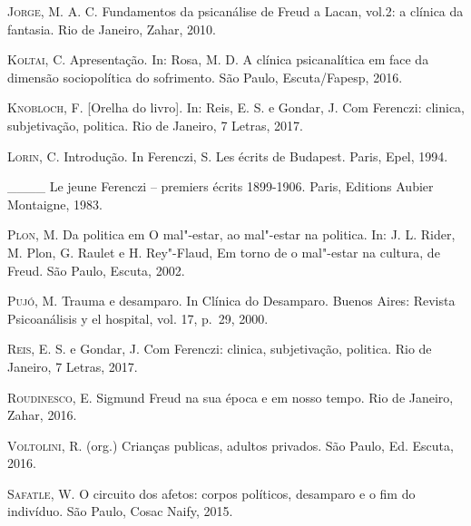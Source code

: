 \textsc{Jorge}, M. A. C. Fundamentos da psicanálise de Freud a Lacan, vol.2: a
clínica da fantasia. Rio de Janeiro, Zahar, 2010.

\textsc{Koltai}, C. Apresentação. In: Rosa, M. D. A clínica psicanalítica em face
da dimensão sociopolítica do sofrimento. São Paulo, Escuta/Fapesp, 2016.

\textsc{Knobloch}, F. {[}Orelha do livro{]}. In: Reis, E. S. e Gondar, J. Com
Ferenczi: clinica, subjetivação, politica. Rio de Janeiro, 7 Letras,
2017.

\textsc{Lorin}, C. Introdução. In Ferenczi, S. Les écrits de Budapest. Paris,
Epel, 1994.

\_\_\_\_ Le jeune Ferenczi -- premiers écrits 1899-1906. Paris, Editions
Aubier Montaigne, 1983.

\textsc{Plon}, M. Da politica em O mal"-estar, ao mal"-estar na politica. In: J. L.
Rider, M. Plon, G. Raulet e H. Rey"-Flaud, Em torno de o mal"-estar na
cultura, de Freud. São Paulo, Escuta, 2002.

\textsc{Pujó}, M. Trauma e desamparo. In Clínica do Desamparo. Buenos Aires:
Revista Psicoanálisis y el hospital, vol. 17, p.~29, 2000.

\textsc{Reis}, E. S. e Gondar, J. Com Ferenczi: clinica, subjetivação, politica.
Rio de Janeiro, 7 Letras, 2017.

\textsc{Roudinesco}, E. Sigmund Freud na sua época e em nosso tempo. Rio de
Janeiro, Zahar, 2016.

\textsc{Voltolini}, R. (org.) Crianças publicas, adultos privados. São Paulo, Ed.
Escuta, 2016.

\textsc{Safatle}, W. O circuito dos afetos: corpos políticos, desamparo e o fim
do indivíduo. São Paulo, Cosac Naify, 2015.
